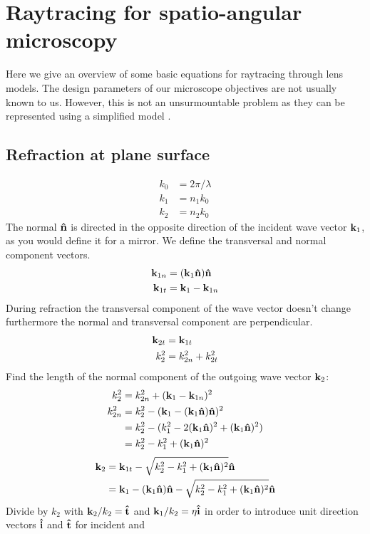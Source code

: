 \chapter{Raytracing for spatio-angular microscopy}
\label{sec:raytrace}
\renewcommand{\i}{\nvect i}

Here we give an overview of some basic equations for raytracing
through lens models. The design parameters of our microscope
objectives are not usually known to us. However, this is not an
unsurmountable problem as they can be represented using a simplified
model \citep{Hwang2008}.

\section{Refraction at plane surface}
\begin{align}
  k_0&=2\pi/\lambda\\
  k_1&=n_1 k_0\\
  k_2&=n_2 k_0
\end{align}
The normal $\mathbf{\hat{n}}$ is directed in the opposite direction of the incident
wave vector $\mathbf{k}_1$, as you would define it for a mirror. We define the
transversal and normal component vectors.
\begin{align}
  \mathbf{k}_{1n}&=(\mathbf{k}_1\mathbf{\hat{n}})\mathbf{\hat{n}}\\ 
  \mathbf{k}_{1t}&=\mathbf{k}_1 - \mathbf{k}_{1n}
\end{align}
During refraction the transversal component of the wave vector doesn't
change furthermore the normal and transversal component are
perpendicular.
\begin{align}
  \mathbf{k}_{2t}&=\mathbf{k}_{1t}\\
  k_2^2&=k_{2n}^2 + k_{2t}^2
\end{align}
Find the length of the normal component of the outgoing wave vector $\mathbf{k}_2$:
\begin{align}
  k_2^2&=k_{2n}^2 + (\mathbf{k}_1 - \mathbf{k}_{1n})^2\\
  k_{2n}^2&=k_2^2-(\mathbf{k}_1-(\mathbf{k}_1\mathbf{\hat{n}})\mathbf{\hat{n}})^2\\
  &= k_2^2-(k_1^2-2(\mathbf{k}_1\mathbf{\hat{n}})^2+(\mathbf{k}_1\mathbf{\hat{n}})^2)\\
  &= k_2^2-k_1^2+(\mathbf{k}_1\mathbf{\hat{n}})^2
\end{align}
\begin{align}
  \mathbf{k}_2&=\mathbf{k}_{1t}-\sqrt{k_2^2-k_1^2+(\mathbf{k}_1\mathbf{\hat{n}})^2}\mathbf{\hat{n}}\\
  &=\mathbf{k}_1-(\mathbf{k}_1\mathbf{\hat{n}})\mathbf{\hat{n}}-\sqrt{k_2^2-k_1^2+(\mathbf{k}_1\mathbf{\hat{n}})^2}\mathbf{\hat{n}}
\end{align}
Divide by $k_2$ with $\mathbf{k}_2/k_2=\mathbf{\hat{t}}$ and $\k_1/k_2=\eta\i$ in order to
introduce unit direction vectors $\i$ and $\mathbf{\hat{t}}$ for incident and
